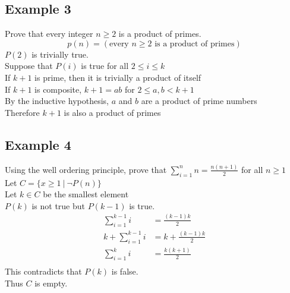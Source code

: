 \documentclass{article}
\theoremstyle{mytheoremstyle}
\theoremstyle{mytheoremstyle}
\theoremstyle{myproblemstyle}
\begin{document}
    \subsection*{Example 3}
    Prove that every integer $n\ge 2$ is a product of primes.
    \[
        p(n) = (\text{every $n\ge 2$ is a product of primes})
    \]
    $P(2)$ is trivially true. \\
    Suppose that $P(i)$ is true for all $2\le i\le k$ \\
    If $k+1$ is prime, then it is trivially a product of itself\\
    If $k+1$ is composite, $k+1=ab$ for $2\le a,b < k+1$ \\
    By the inductive hypothesis, $a$ and $b$ are a product of prime numbers \\
    Therefore $k+1$ is also a product of primes

    \subsection*{Example 4}
    Using the well ordering principle, prove that $\sum_{i=1}^{n} n =
    \frac{n(n+1)}{2}$ for all $n \ge 1$\\
    Let $C = \{x \ge 1\ |\ \neg P(n)\}$ \\
    Let $k\in C$ be the smallest element \\
    $P(k)$ is not true but $P(k-1)$ is true.
    \begin{align*}
        \sum_{i=1}^{k-1} i &= \frac{(k-1)k}{2} \\
        k + \sum_{i=1}^{k-1} i &= k + \frac{(k-1)k}{2} \\
        \sum_{i=1}^{k} i &= \frac{k(k+1)}{2} \\
    \end{align*}
    This contradicts that $P(k)$ is false. \\
    Thus $C$ is empty.
\end{document}

